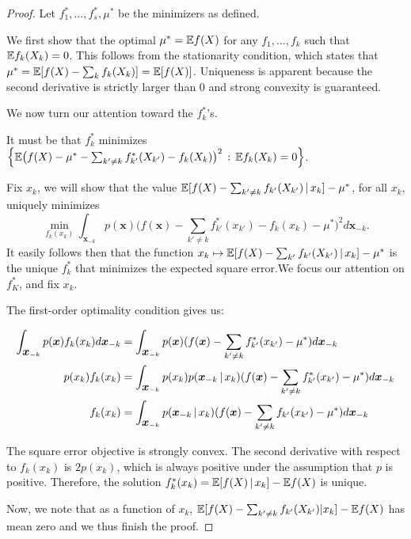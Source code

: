 \begin{proof}
Let $f^*_1,...,f^*_s, \mu^*$ be the minimizers as defined. 

We first show that the optimal $\mu^* = {\mathbb E} f(X)$ for any $f_1, ..., f_k$ such that ${\mathbb E} f_k(X_k) = 0$. This follows from the stationarity condition, which states that $\mu^* = {\mathbb E}[ f(X) - \sum_k f_k(X_k)] = {\mathbb E}[ f(X) ]$. Uniqueness is apparent because the second derivative is strictly larger than 0 and strong convexity is guaranteed.

We now turn our attention toward the $f^*_k$'s. 

It must be that $f^*_k$ minimizes $\Big\{ {\mathbb E} \big( f(X) - \mu^* - \sum_{k' \neq k} f^*_{k'} (X_{k'}) - f_k (X_k) \big)^2 \,:\, {\mathbb E} f_k(X_k) = 0 \Big\}$.

Fix $x_k$, we will show that the value 
${\mathbb E}[ f(X) - \sum_{k' \neq k} f_{k'}(X_{k'}) {\,|\,} x_k] - \mu^*$, for all $x_k$,  
uniquely minimizes 
\[
\min_{ f_k(x_k) } \int_{\mathbf{x}_{-k}} p(\mathbf{x}) 
         \Big( f(\mathbf{x}) - \sum_{k' \neq k} f^*_{k'} (x_{k'}) - f_k (x_k) -\mu^*\Big)^2 
                 d \mathbf{x}_{-k}.
\]
It easily follows then that the function $x_k \mapsto {\mathbb E}[ f(X) - \sum_{k'} f_{k'} (X_{k'}) {\,|\,} x_k] - \mu^*$ is the unique $f^*_k$ that minimizes the expected square error.We focus our attention on $f^*_K$, and fix $x_k$. 

The first-order optimality condition gives us:

\begin{align*}
\int_{\mbox{\boldmath $x$}_{-k}} p(\mbox{\boldmath $x$}) f_k(x_k) d \mbox{\boldmath $x$}_{-k} &= 
  \int_{\mbox{\boldmath $x$}_{-k}} p(\mbox{\boldmath $x$}) 
      ( f(\mbox{\boldmath $x$})-\sum_{k' \neq k} f^*_{k'}(x_{k'})-\mu^*) d \mbox{\boldmath $x$}_{-k} \\  
p(x_k) f_k(x_k) &= \int_{\mbox{\boldmath $x$}_{-k}} p(x_k)
     p(\mbox{\boldmath $x$}_{-k} {\,|\,} x_k ) 
     ( f(\mbox{\boldmath $x$}) - \sum_{k' \neq k} f^*_{k'} (x_{k'})-\mu^*) 
              d \mbox{\boldmath $x$}_{-k} \\
f_k(x_k) &= \int_{\mbox{\boldmath $x$}_{-k}} 
       p(\mbox{\boldmath $x$}_{-k} {\,|\,} x_k ) 
     (f(\mbox{\boldmath $x$}) - \sum_{k'\neq k} f_{k'} (x_{k'})  -\mu^*) d \mbox{\boldmath $x$}_{-k} 
 \end{align*}

The square error objective is strongly convex. The second derivative with respect to $f_k(x_k)$ is $2 p(x_k)$, which is always positive under the assumption that $p$ is positive. Therefore, the solution $f^*_k(x_k) = {\mathbb E}[ f(X) {\,|\,} x_k ] - {\mathbb E} f(X)$ is unique.

Now, we note that as a function of $x_k$, ${\mathbb E}[ f(X) -\sum_{k'\neq k} f_{k'}(X_{k'}) | x_k] - {\mathbb E} f(X)$ has mean zero and we thus finish the proof.
\end{proof}

